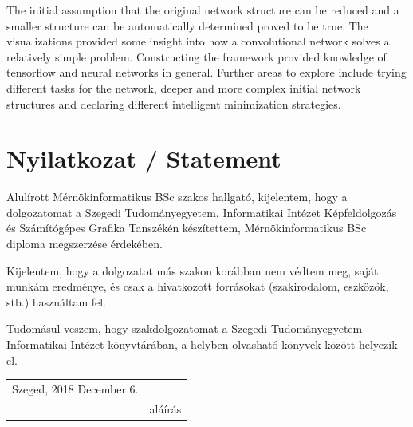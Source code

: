 \documentclass[12pt]{report}
\begin{document}
The initial assumption that the original network structure can be reduced	 and a smaller structure can be automatically determined proved to be true. The visualizations provided some insight into how a convolutional network solves a relatively simple problem. Constructing the framework provided knowledge of tensorflow and neural networks in general. Further areas to explore include trying different tasks for the network, deeper and more complex initial network structures and declaring different intelligent minimization strategies.

\chapter*{Nyilatkozat / Statement}
\hspace{\parindent}



\noindent
Alulírott Mérnökinformatikus BSc szakos hallgató, kijelentem, hogy a dolgozatomat a Szegedi Tudományegyetem, Informatikai Intézet Képfeldolgozás és Számítógépes Grafika Tanszékén készítettem, Mérnökinformatikus BSc diploma megszerzése érdekében.

Kijelentem, hogy a dolgozatot más szakon korábban nem védtem meg, saját munkám eredménye, és csak a hivatkozott forrásokat (szakirodalom, eszközök, stb.) használtam fel.

Tudomásul veszem, hogy szakdolgozatomat a Szegedi Tudományegyetem Informatikai Intézet könyvtárában, a helyben olvasható könyvek között helyezik el.

\vspace*{2cm}

\begin{tabular}{lc}
	Szeged, 2018 December 6.
	\hspace{2cm} & \makebox[6cm]{\dotfill} \\
	& aláírás \\
\end{tabular}
\end{document}
